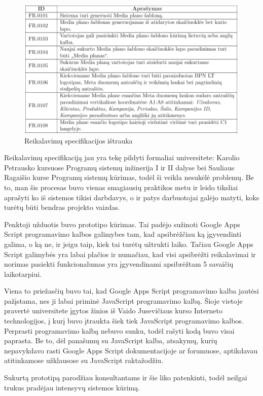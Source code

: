 \documentclass{VUMIFPSkursinis}
\begin{document}
\begin{figure}[H]
    \centering
    \includegraphics[scale=0.7]{img/reikalavimai}
    \caption{Reikalavimų specifikacijos ištrauka}
    \label{img:model}
\end{figure}

Reikalavimų specifikaciją jau yra tekę pildyti formaliai universitete: Karolio Petrausko kursuose Programų sistemų inžinerija I ir II dalyse bei Sauliaus Ragaišio kurse Programų sistemų kūrimas, todėl ši veikla nesukėlė problemų. Be to, man šis procesas buvo vienas smagiausių praktikos metu ir leido tiksliai aprašyti ko iš sistemos tikisi darbdavys, o ir patys darbuotojai galėjo matyti, koks turėtų būti bendras projekto vaizdas.

Penktoji užduotis buvo prototipo kūrimas. Tai padėjo sužinoti Google Apps Script programavimo kalbos galimybes tam, kad apsibrėžčiau ką įgyvendinti galima, o ką ne, ir jeigu taip, kiek tai turėtų užtrukti laiko. Tačiau Google Apps Script galimybės yra labai plačios ir numačiau, kad  visi apsibrėžti reikalavimai ir norimas pasiekti funkcionalumas yra įgyvendinami apsibrėžtam 5 savaičių laikotarpiui. 

Viena to priežasčių buvo tai, kad Google Apps Script programavimo kalba jautėsi pažįstama, nes ji labai priminė JavaScript programavimo kalbą. Šioje vietoje pravertė universitete įgytos žinios iš Vaido Jusevičiaus kurso Interneto technologijos, į kurį buvo įtraukta šiek tiek JavaScript programavimo kalbos. Perprasti programavimo kalbą nebuvo sunku, todėl rašyti kodą buvo visai paprasta. Be to, dėl panašumų su JavaScript kalba, atsakymų, kurių nepavykdavo rasti Google Apps Script dokumentacijoje ar forumuose, aptikdavau atitinkamose užklausose su JavaScript raktažodžiu.

Sukurtą prototipą parodžiau konsultantams ir šie liko patenkinti, todėl neilgai trukus pradėjau intensyvų sistemos kūrimą.
\end{document}

